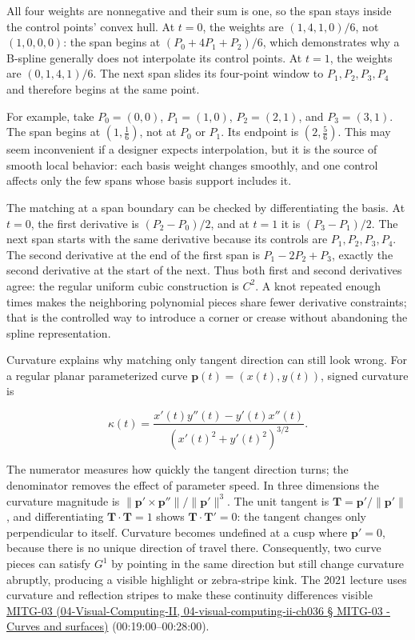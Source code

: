 All four weights are nonnegative and their sum is one, so the span stays inside the control points' convex hull. At \(t=0\), the weights are \((1,4,1,0)/6\), not \((1,0,0,0)\): the span begins at \((P_0+4P_1+P_2)/6\), which demonstrates why a B-spline generally does not interpolate its control points. At \(t=1\), the weights are \((0,1,4,1)/6\). The next span slides its four-point window to \(P_1,P_2,P_3,P_4\) and therefore begins at the same point.

For example, take \(P_0=(0,0)\), \(P_1=(1,0)\), \(P_2=(2,1)\), and \(P_3=(3,1)\). The span begins at \((1,\frac16)\), not at \(P_0\) or \(P_1\). Its endpoint is \((2,\frac56)\). This may seem inconvenient if a designer expects interpolation, but it is the source of smooth local behavior: each basis weight changes smoothly, and one control affects only the few spans whose basis support includes it.

The matching at a span boundary can be checked by differentiating the basis. At \(t=0\), the first derivative is \((P_2-P_0)/2\), and at \(t=1\) it is \((P_3-P_1)/2\). The next span starts with the same derivative because its controls are \(P_1,P_2,P_3,P_4\). The second derivative at the end of the first span is \(P_1-2P_2+P_3\), exactly the second derivative at the start of the next. Thus both first and second derivatives agree: the regular uniform cubic construction is \(C^2\). A knot repeated enough times makes the neighboring polynomial pieces share fewer derivative constraints; that is the controlled way to introduce a corner or crease without abandoning the spline representation.

Curvature explains why matching only tangent direction can still look wrong. For a regular planar parameterized curve \(\boldsymbol{p}(t)=(x(t),y(t))\), signed curvature is

\[
\kappa(t)=\frac{x'(t)y''(t)-y'(t)x''(t)}
{\left(x'(t)^2+y'(t)^2\right)^{3/2}}.
\]

The numerator measures how quickly the tangent direction turns; the denominator removes the effect of parameter speed. In three dimensions the curvature magnitude is \(\|\boldsymbol{p}'\times\boldsymbol{p}''\|/\|\boldsymbol{p}'\|^3\). The unit tangent is \(\boldsymbol{T}=\boldsymbol{p}'/\|\boldsymbol{p}'\|\), and differentiating \(\boldsymbol{T}\cdot\boldsymbol{T}=1\) shows \(\boldsymbol{T}\cdot\boldsymbol{T}'=0\): the tangent changes only perpendicular to itself. Curvature becomes undefined at a cusp where \(\boldsymbol{p}'=0\), because there is no unique direction of travel there. Consequently, two curve pieces can satisfy \(G^1\) by pointing in the same direction but still change curvature abruptly, producing a visible highlight or zebra-stripe kink. The 2021 lecture uses curvature and reflection stripes to make these continuity differences visible \href{}{MITG-03 (04-Visual-Computing-II, 04-visual-computing-ii-ch036 § MITG-03 - Curves and surfaces)} (00:19:00--00:28:00).

